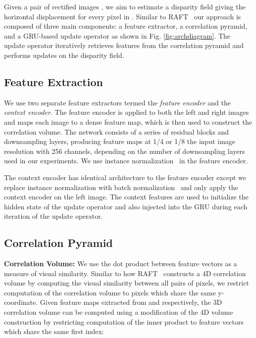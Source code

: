 \documentclass[10pt,twocolumn,letterpaper]{article}
\begin{document}
Given a pair of rectified images , we aim to estimate a disparity field  giving the horizontal displacement for every pixel in . Similar to RAFT~\cite{teed2020raft} our approach is composed of three main components: a feature extractor, a correlation pyramid, and a GRU-based update operator as shown in Fig. \ref{fig:archdiagram}. The update operator iteratively retrieves features from the correlation pyramid and performs updates on the disparity field.

\subsection{Feature Extraction}
We use two separate feature extractors termed the \emph{feature encoder} and the \emph{context encoder}. The feature encoder is applied to both the left and right images and maps each image to a dense feature map, which is then used to construct the correlation volume. The network consists of a series of residual blocks and downsampling layers, producing feature maps at 1/4 or 1/8 the input image resolution with 256 channels, depending on the number of downsampling layers used in our experiments. We use instance normalization~\cite{ulyanov2016instance} in the feature encoder. 

The context encoder has identical architecture to the feature encoder except we replace instance normalization with batch normalization~\cite{ioffe2015batch} and only apply the context encoder on the left image. The context features are used to initialize the hidden state of the update operator and also injected into the GRU during each iteration of the update operator.

\subsection{Correlation Pyramid}

\noindent \textbf{Correlation Volume:} We use the dot product between feature vectors as a measure of visual similarity. Similar to how RAFT~\cite{teed2020raft} constructs a 4D correlation volume by computing the visual similarity between all pairs of pixels, we restrict computation of the correlation volume to pixels which share the same y-coordinate. Given feature maps  extracted from  and  respectively, the 3D correlation volume can be computed using a modification of the 4D volume construction by restricting computation of the inner product to feature vectors which share the same first index:
\end{document}
